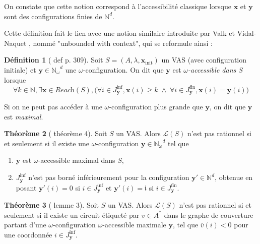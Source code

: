 \documentclass[a4paper,final]{article}
\theoremstyle{definition}
\newtheorem{Theorem}{Théorème}
\newtheorem{Definition}[Theorem]{Définition}
\let\geq\geqslant
\newcommand{\set}[2]{\left\{#1\mathrel{\left|\vphantom{#1}\vphantom{#2}\right.}#2\right\}}
\newcommand{\N}{\ensuremath{\mathbb{N}}}
\newcommand{\Nomega}{\ensuremath{\mathbb{N}_\omega}}
\newcommand{\lang}{\ensuremath{\mathcal{L}}}
\newcommand{\reach}{\ensuremath{\textit{Reach}}}
\newcommand{\vect}[1]{\ensuremath{\mathbf{#1}}}
\newcommand{\xinit}{\ensuremath{\vect{x}_\text{init}}}
\newcommand{\valeur}[1]{\ensuremath{\overline{#1}}}
\newcommand{\Jfin}[1]{J^\text{fin}_#1}
\newcommand{\Jinf}[1]{J^\text{inf}_#1}
\begin{document}
On constate que cette notion correspond à l'accessibilité classique lorsque $\vect{x}$ et $\vect{y}$ sont des configurations finies de $\N^d$.

Cette définition fait le lien avec une notion similaire introduite par Valk et Vidal-Naquet \cite{vavn81}, nommé "unbounded with context", qui se reformule ainsi :

\begin{Definition}[\cite{vavn81} def p. 309]
Soit $S = (A,\lambda,\xinit)$ un VAS (avec configuration initiale) et $\vect{y} \in \Nomega^d$ une $\omega$-configuration.
On dit que $\vect{y}$ est \emph{$\omega$-accessible dans $S$} lorsque
$$\forall k\in\N, \exists \vect{x}\in\reach(S), \big( \forall i\in \Jinf{\vect{y}}, \vect{x}(i) \geq k \;\land\; \forall i \in \Jfin{\vect{y}}, \vect{x}(i) = \vect{y}(i) \big)$$

Si on ne peut pas accéder à une $\omega$-configuration  plus grande que $\vect{y}$, on dit que $\vect{y}$ est \emph{maximal}.
\end{Definition}

\begin{Theorem}[\cite{vavn81} théorème 4]
Soit $S$ un VAS.
Alors $\lang(S)$ n'est pas rationnel si et seulement si
il existe une $\omega$-configuration $\vect{y} \in \Nomega^d$ tel que
\begin{enumerate}
    \item $\vect{y}$ est $\omega$-accessible maximal dans $S$,
    \item $\Jinf{\vect{y}}$ n'est pas borné inférieurement pour la configuration $\vect{y'}\in\N^d$, 
    obtenue en posant $\vect{y'}(i) = 0$ si $i\in \Jinf{\vect{y}}$ et $\vect{y'}(i) = \mathfrak{i}$ si $i\in \Jfin{\vect{y}}$.
\end{enumerate}
\end{Theorem}

\begin{Theorem}[\cite{vavn81} lemme 3]
Soit $S$ un VAS.
Alors $\lang(S)$ n'est pas rationnel si et seulement si
il existe un circuit étiqueté par $v\in A^*$ dans le graphe de couverture partant d'une $\omega$-configuration $\omega$-accessible maximale $\vect{y}$, 
tel que $\valeur{v}(i) < 0$ pour une coordonnée $i\in \Jinf{\vect{y}}$.
\end{Theorem}
\end{document}
